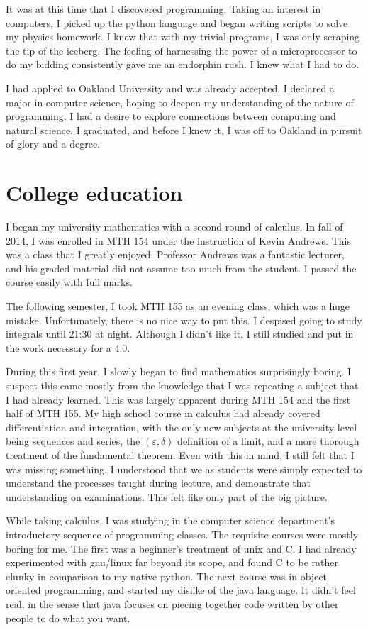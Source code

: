 \documentclass[12pt]{amsart}
\begin{document}
It was at this time that I discovered programming. Taking an interest in computers, I picked up the python language and began writing scripts to solve my physics homework. I knew that with my trivial programs, I was only scraping the tip of the iceberg. The feeling of harnessing the power of a microprocessor to do my bidding consistently gave me an endorphin rush. I knew what I had to do.

I had applied to Oakland University and was already accepted. I declared a major in computer science, hoping to deepen my understanding of the nature of programming. I had a desire to explore connections between computing and natural science. I graduated, and before I knew it, I was off to Oakland in pursuit of glory and a degree.


\section{College education}

I began my university mathematics with a second round of calculus. In fall of 2014, I was enrolled in MTH 154 under the instruction of Kevin Andrews. This was a class that I greatly enjoyed. Professor Andrews was a fantastic lecturer, and his graded material did not assume too much from the student. I passed the course easily with full marks.

The following semester, I took MTH 155 as an evening class, which was a huge mistake. Unfortunately, there is no nice way to put this. I despised going to study integrals until 21:30 at night. Although I didn't like it, I still studied and put in the work necessary for a 4.0.

During this first year, I slowly began to find mathematics surprisingly boring. I suspect this came mostly from the knowledge that I was repeating a subject that I had already learned. This was largely apparent during MTH 154 and the first half of MTH 155. My high school course in calculus had already covered differentiation and integration, with the only new subjects at the university level being sequences and series, the $(\varepsilon, \delta)$ definition of a limit, and a more thorough treatment of the fundamental theorem. Even with this in mind, I still felt that I was missing something. I understood that we as students were simply expected to understand the processes taught during lecture, and demonstrate that understanding on examinations. This felt like only part of the big picture.

While taking calculus, I was studying in the computer science department's introductory sequence of programming classes. The requisite courses were mostly boring for me. The first was a beginner's treatment of unix and C. I had already experimented with gnu/linux far beyond its scope, and found C to be rather clunky in comparison to my native python. The next course was in object oriented programming, and started my dislike of the java language. It didn't feel real, in the sense that java focuses on piecing together code written by other people to do what you want.
\end{document}
